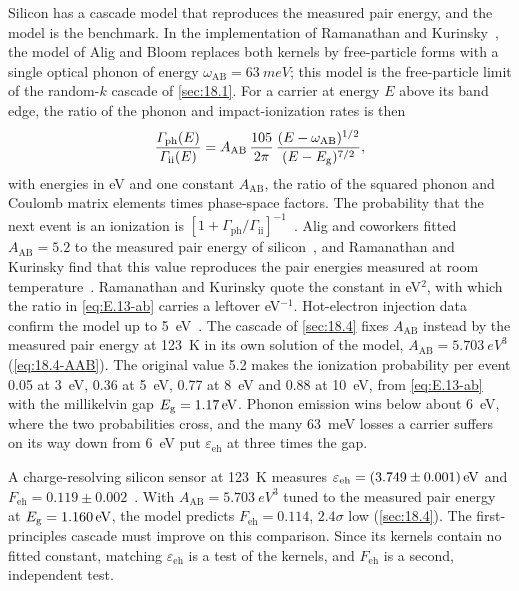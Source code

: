 Silicon has a cascade model that reproduces the measured pair energy, and the model is the benchmark. In the implementation of Ramanathan and Kurinsky~\cite{ramanathan2020ionization}, the model of Alig and Bloom replaces both kernels by free-particle forms with a single optical phonon of energy $\omega_{\mathrm{AB}} = \SI{63}{meV}$; this model is the free-particle limit of the random-$k$ cascade of \cref{sec:18.1}. For a carrier at energy $E$ above its band edge, the ratio of the phonon and impact-ionization rates is then~\cite[Eq.~(8)]{ramanathan2020ionization}
\begin{equation}
  \frac{\varGamma_{\mathrm{ph}}(E)}{\varGamma_{\mathrm{ii}}(E)} = A_{\mathrm{AB}}\,\frac{105}{2\pi}\,\frac{(E - \omega_{\mathrm{AB}})^{1/2}}{(E - E_{\mathrm{g}})^{7/2}} ,
  \label{eq:E.13-ab}
\end{equation}
with energies in eV and one constant $A_{\mathrm{AB}}$, the ratio of the squared phonon and Coulomb matrix elements times phase-space factors. The probability that the next event is an ionization is $[1 + \varGamma_{\mathrm{ph}}/\varGamma_{\mathrm{ii}}]^{-1}$~\cite[Eq.~(10)]{ramanathan2020ionization}. Alig and coworkers fitted $A_{\mathrm{AB}} = 5.2$ to the measured pair energy of silicon~\cite[Sect.~II]{nielsen2026first}, and Ramanathan and Kurinsky find that this value reproduces the pair energies measured at room temperature~\cite[Table~I and Sect.~IV\,A]{ramanathan2020ionization}. Ramanathan and Kurinsky quote the constant in eV$^2$, with which the ratio in \cref{eq:E.13-ab} carries a leftover eV$^{-1}$. Hot-electron injection data confirm the model up to \SI{5}{eV}~\cite[Sect.~III and Table~I]{ramanathan2020ionization}. The cascade of \cref{sec:18.4} fixes $A_{\mathrm{AB}}$ instead by the measured pair energy at \SI{123}{K} in its own solution of the model, $A_{\mathrm{AB}} = \SI{5.703}{eV^3}$ (\cref{eq:18.4-AAB}). The original value 5.2 makes the ionization probability per event 0.05 at \SI{3}{eV}, 0.36 at \SI{5}{eV}, 0.77 at \SI{8}{eV} and 0.88 at \SI{10}{eV}, from \cref{eq:E.13-ab} with the millikelvin gap $E_{\mathrm{g}} = \SI{1.17}{eV}$. Phonon emission wins below about \SI{6}{eV}, where the two probabilities cross, and the many \SI{63}{meV} losses a carrier suffers on its way down from \SI{6}{eV} put $\varepsilon_{\mathrm{eh}}$ at three times the gap.

A charge-resolving silicon sensor at \SI{123}{K} measures $\varepsilon_{\mathrm{eh}} = \SI{3.749 \pm 0.001}{eV}$ and $F_{\mathrm{eh}} = 0.119 \pm 0.002$~\cite{rodrigues2021absolute}. With $A_{\mathrm{AB}} = \SI{5.703}{eV^3}$ tuned to the measured pair energy at $E_{\mathrm{g}} = \SI{1.160}{eV}$, the model predicts $F_{\mathrm{eh}} = 0.114$, $2.4\sigma$ low (\cref{sec:18.4}). The first-principles cascade must improve on this comparison. Since its kernels contain no fitted constant, matching $\varepsilon_{\mathrm{eh}}$ is a test of the kernels, and $F_{\mathrm{eh}}$ is a second, independent test.

